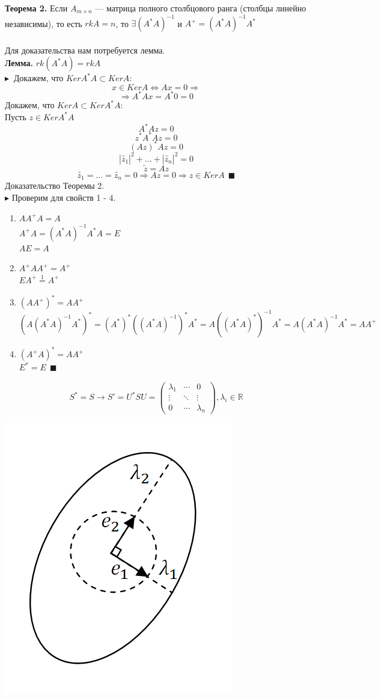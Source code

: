 \documentclass[12pt]{article}
\theoremstyle{definition}
\numberwithin{equation}{section}
\begin{document}
\textbf{Теорема 2.}
Если $A_{m \times n}$ --- матрица полного столбцового ранга (столбцы линейно независимы), то есть $rkA=n$, то $\exists (A^*A)^{-1}$ и $A^+=(A^*A)^{-1}A^*$\\\\
Для доказательства нам потребуется лемма.\\
\textbf{Лемма.}
$rk(A^*A)=rkA$\\
$\blacktriangleright ~$ 
Докажем, что $Ker A^*A\subset Ker A$:
$$x\in Ker A \Leftrightarrow Ax=0\Rightarrow$$
$$\Rightarrow A^*Ax=A^* {0}=0$$
Докажем, что $Ker A\subset Ker A^*A$:\\
Пусть $z\in Ker A^*A$\\
$$A^*Az=0$$
$$z^*A^*Az=0$$
$$(Az)^*Az=0$$
$$|\tilde{z_1}|^2+...+|\tilde{z_n}|^2=0$$
$$\tilde{z}=Az$$
$$\tilde{z_1}=...=\tilde{z_n}=0 \Rightarrow Az=0 \Rightarrow z\in Ker A~~ \blacksquare$$
Доказательство Теоремы 2.\\
$\blacktriangleright$ Проверим для свойств 1 - 4.
\begin{enumerate}
\item $AA^+A=A$\\
$A^+A=(A^*A)^{-1}A^*A=E$\\
$AE=A$
\item $A^+AA^+=A^+$\\
$EA^+\overset{1}{=}A^+$
\item $(AA^+)^*=AA^+$\\
$(A(A^*A)^{-1}A^*)^*=(A^*)^*((A^*A)^{-1})^*A^*=A((A^*A)^*)^{-1}A^*=A(A^*A)^{-1}A^*=AA^+$
\item $(A^+A)^*=AA^+$\\
$E^*=E ~~
\blacksquare$
\end{enumerate}
\[S^*=S \to S'=U^*SU = \begin{pmatrix}
\lambda_1 & \cdots & 0 \\         
\vdots & \ddots & \vdots \\
0 & \cdots & \lambda_n
\end{pmatrix}, \lambda_i \in \mathbb{R}\]
\begin{center} \includegraphics[scale=0.5]{l1_2}\end{center}
\end{document}
